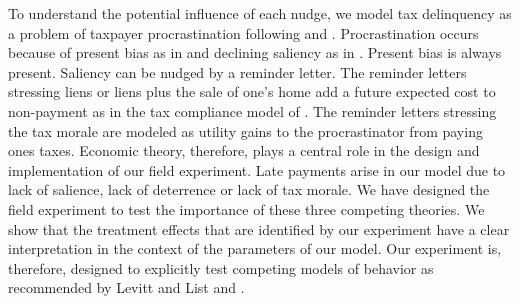 To understand the potential influence of each nudge, we model tax
delinquency as a problem of taxpayer procrastination following
\cite{Akerlof-91} and \cite{DR-99}.  Procrastination occurs 
because of present bias as in \cite{DR-99} and declining saliency as in
\cite{Akerlof-91}.  Present bias is always present.  Saliency can be
nudged by a reminder letter.  The reminder letters stressing liens or
liens plus the sale of one's home add a future expected cost to
non-payment as in the tax compliance model of
\cite{Allingham-Sandmo-72}.  The reminder letters stressing the tax
morale are modeled as utility gains to the procrastinator from paying
ones taxes.  Economic theory, therefore, plays a central role in the design and implementation
of our field experiment. Late payments arise in our model 
due to lack of salience, lack of deterrence or lack of tax morale.  
We have designed the field experiment to test the importance of these 
three competing theories. We show that the treatment effects that are identified
by our experiment have a clear interpretation in the context of the
parameters of our model.  Our experiment is, therefore, designed to explicitly
test competing models of behavior as recommended by Levitt and List
\citeyearpar{levitt2007laboratory} and \cite{cdvm-11}.

